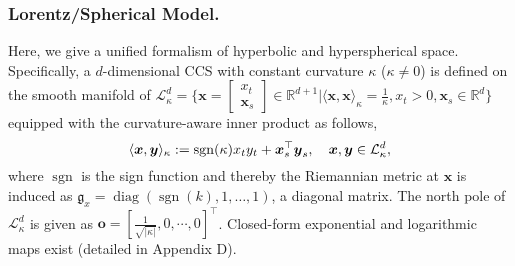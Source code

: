 \vspace{-0.05in}
\subsubsection*{\textbf{Lorentz/Spherical Model.}}
Here, we give a unified formalism of hyperbolic and hyperspherical space.
Specifically, a $d$-dimensional CCS with constant curvature $\kappa$ ($\kappa \neq 0$) is defined on the smooth manifold of 
$\mathcal L_{\kappa }^{d}=\{ \boldsymbol x=
\left[\begin{array}{c}
x_t  \\
\boldsymbol x_s 
\end{array}\right] \in \mathbb R^{d+1} 
| \langle \boldsymbol x, \boldsymbol x \rangle_\kappa = \frac{1}{\kappa}, x_t >0, \boldsymbol x_s \in \mathbb R^d\}$
equipped with the curvature-aware inner product as follows,
\vspace{-0.05in}
\begin{equation}
    \langle \boldsymbol x, \boldsymbol y \rangle_\kappa:=\operatorname{sgn}(\kappa) x_{t} y_{t}+\boldsymbol x_{s}^{\top}\boldsymbol y_{s}, \quad  \boldsymbol x, \boldsymbol y \in \mathcal L_{\kappa }^{d},
    \vspace{-0.03in}
    \label{manifold}
\end{equation}
where
    $\operatorname{sgn}$ is the sign function and thereby the Riemannian metric at $\boldsymbol x$ is induced as 
$\mathfrak{g}_x= \operatorname{diag}(\operatorname{sgn}(k), 1, \ldots, 1)$, a diagonal matrix.
The north pole of $\mathcal L_{\kappa }^{d}$ is given as $\boldsymbol o=[\frac{1}{\sqrt{|\kappa|}}, 0, \cdots, 0]^\top$.
Closed-form exponential and logarithmic maps exist (detailed in Appendix D).

